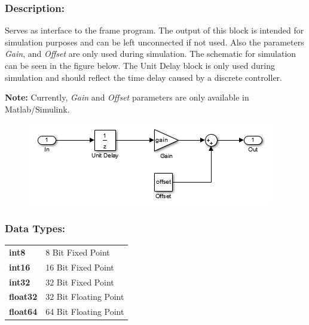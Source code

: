 \subsubsection*{Description:}
Serves as interface to the frame program. The output of this block is intended for simulation purposes and can be left unconnected if not used. Also the parameters \textit{Gain}, and \textit{Offset} are only used during simulation. The schematic for simulation can be seen in the figure below. The Unit Delay block is only used during simulation and should reflect the time delay caused by a discrete controller.

\textbf{Note:} Currently, \textit{Gain} and \textit{Offset} parameters are only available in Matlab/Simulink.
\begin{figure}[H]
  \includegraphics{Outport_Schematic}
\end{figure}

\subsubsection*{Data Types:}
\begin{tabular}{l l}
\textbf{int8} & 8 Bit Fixed Point\tabularnewline
\textbf{int16} & 16 Bit Fixed Point\tabularnewline
\textbf{int32} & 32 Bit Fixed Point\tabularnewline
\textbf{float32} & 32 Bit Floating Point\tabularnewline
\textbf{float64} & 64 Bit Floating Point\tabularnewline
\end{tabular}
